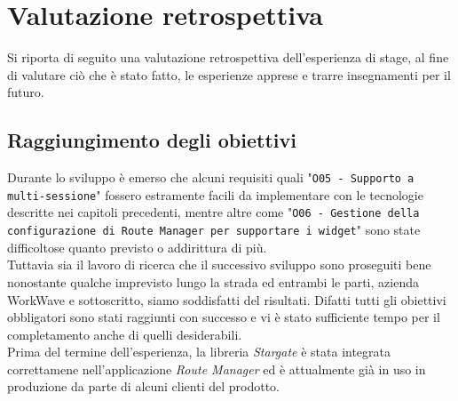
\chapter{Valutazione retrospettiva}
\label{cap:valutazione}

Si riporta di seguito una valutazione retrospettiva dell'esperienza di stage, al fine di valutare ciò che è stato fatto, le esperienze apprese e trarre insegnamenti per il futuro.

\section{Raggiungimento degli obiettivi}

Durante lo sviluppo è emerso che alcuni requisiti quali "\texttt{O05 - Supporto a multi-sessione}" fossero estramente facili da implementare con le tecnologie descritte nei capitoli precedenti, mentre altre come "\texttt{O06 - Gestione della configurazione di Route Manager per supportare i widget}" sono state difficoltose quanto previsto o addirittura di più. \\

Tuttavia sia il lavoro di ricerca che il successivo sviluppo sono proseguiti bene nonostante qualche imprevisto lungo la strada ed entrambi le parti, azienda WorkWave e sottoscritto, siamo soddisfatti del risultati. Difatti tutti gli obiettivi obbligatori sono stati raggiunti con successo e vi è stato sufficiente tempo per il completamento anche di quelli desiderabili. \\

Prima del termine dell'esperienza, la libreria \textit{Stargate} è stata integrata correttamene nell'applicazione \textit{Route Manager} ed è attualmente già in uso in produzione da parte di alcuni clienti del prodotto. \\

